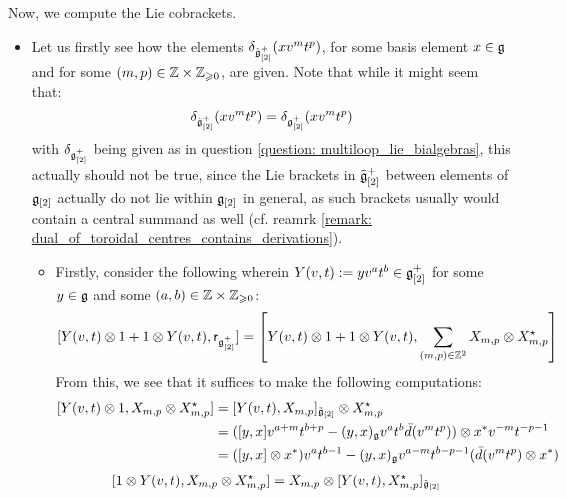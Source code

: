 \begin{remark}
                Now, we compute the Lie cobrackets.
                \begin{itemize}
                    \item Let us firstly see how the elements $\delta_{\hat{\g}_{[2]}^+}(x v^m t^p)$, for some basis element $x \in \g$ and for some $(m, p) \in \Z \x \Z_{\geq 0}$, are given. Note that while it might seem that:
                        $$\delta_{\hat{\g}_{[2]}^+}(x v^m t^p) = \delta_{\g_{[2]}^+}(x v^m t^p)$$
                    with $\delta_{\g_{[2]}^+}$ being given as in question \ref{question: multiloop_lie_bialgebras}, this actually should not be true, since the Lie brackets in $\tilde{\g}_{[2]}^+$ between elements of $\g_{[2]}$ actually do not lie within $\g_{[2]}$ in general, as such brackets usually would contain a central summand as well (cf. reamrk \ref{remark: dual_of_toroidal_centres_contains_derivations}).  
                    \begin{itemize}
                        \item Firstly, consider the following wherein $Y(v, t) := y v^a t^b \in \g_{[2]}^+$ for some $y \in \g$ and some $(a, b) \in \Z \x \Z_{\geq 0}$:
                            $$[ Y(v, t) \tensor 1 + 1 \tensor Y(v, t), \sfr_{ \g_{[2]}^+ }] = \left[ Y(v, t) \tensor 1 + 1 \tensor Y(v, t), \sum_{(m, p) \in \Z^2} X_{m, p} \tensor X_{m, p}^{\star} \right]$$
                        From this, we see that it suffices to make the following computations:
                            $$
                                \begin{aligned}
                                    [ Y(v, t) \tensor 1, X_{m, p} \tensor X_{m, p}^{\star} ] & = [Y(v, t), X_{m, p}]_{\tilde{\g}_{[2]}} \tensor X_{m, p}^{\star}
                                    \\
                                    & = ( [y, x] v^{a + m} t^{b + p} - (y, x)_{\g} v^a t^b \bar{d}(v^m t^p) ) \tensor x^* v^{-m} t^{-p - 1}
                                    \\
                                    & = ( [y, x] \tensor x^* ) v^a t^{b - 1} - (y, x)_{\g} v^{a - m} t^{b - p - 1} ( \bar{d}(v^m t^p) \tensor x^* )
                                \end{aligned}
                            $$
                            $$
                                \begin{aligned}
                                    [ 1 \tensor Y(v, t), X_{m, p} \tensor X_{m, p}^{\star} ] & = X_{m, p} \tensor [Y(v, t), X_{m, p}^{\star}]_{\tilde{\g}_{[2]}}

\end{aligned}$$
\end{itemize}
\end{itemize}
\end{remark}
